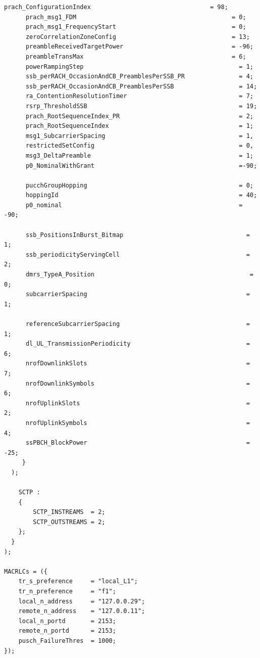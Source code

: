 \begin{lstlisting}[style=confstyle, caption=DU0 band78 PCI 0 Configuration]
      prach_ConfigurationIndex                                 = 98;
      prach_msg1_FDM                                           = 0;
      prach_msg1_FrequencyStart                                = 0;
      zeroCorrelationZoneConfig                                = 13;
      preambleReceivedTargetPower                              = -96;
      preambleTransMax                                         = 6;
      powerRampingStep                                           = 1;
      ssb_perRACH_OccasionAndCB_PreamblesPerSSB_PR               = 4;
      ssb_perRACH_OccasionAndCB_PreamblesPerSSB                  = 14;
      ra_ContentionResolutionTimer                               = 7;
      rsrp_ThresholdSSB                                          = 19;
      prach_RootSequenceIndex_PR                                 = 2;
      prach_RootSequenceIndex                                    = 1;
      msg1_SubcarrierSpacing                                     = 1,
      restrictedSetConfig                                        = 0,
      msg3_DeltaPreamble                                         = 1;
      p0_NominalWithGrant                                        =-90;

      pucchGroupHopping                                          = 0;
      hoppingId                                                  = 40;
      p0_nominal                                                 = -90;

      ssb_PositionsInBurst_Bitmap                                  = 1;
      ssb_periodicityServingCell                                   = 2;
      dmrs_TypeA_Position                                           = 0;
      subcarrierSpacing                                            = 1;

      referenceSubcarrierSpacing                                   = 1;
      dl_UL_TransmissionPeriodicity                                = 6;
      nrofDownlinkSlots                                            = 7;
      nrofDownlinkSymbols                                          = 6;
      nrofUplinkSlots                                              = 2;
      nrofUplinkSymbols                                            = 4;
      ssPBCH_BlockPower                                            = -25;
     }
  );

    SCTP :
    {
        SCTP_INSTREAMS  = 2;
        SCTP_OUTSTREAMS = 2;
    };
  }
);

MACRLCs = ({
    tr_s_preference     = "local_L1";
    tr_n_preference     = "f1";
    local_n_address     = "127.0.0.29";
    remote_n_address    = "127.0.0.11";
    local_n_portd       = 2153;
    remote_n_portd      = 2153;
    pusch_FailureThres  = 1000;
});


\end{lstlisting}
